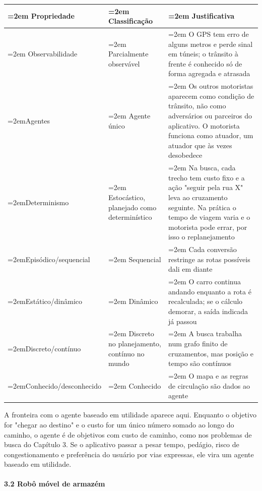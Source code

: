 \documentclass[12pt, a4paper]{article}
\begin{document}
\begingroup
\setlength{\tabcolsep}{4.0pt}
\begin{longtable}{@{}>{\raggedright\hyphenpenalty=30\tolerance=999\emergencystretch=2em\arraybackslash}p{4.50cm}>{\raggedright\hyphenpenalty=30\tolerance=999\emergencystretch=2em\arraybackslash}p{3.40cm}>{\raggedright\hyphenpenalty=30\tolerance=999\emergencystretch=2em\arraybackslash}p{6.82cm}@{}}
\toprule\noalign{}
Propriedade & Clas\-si\-fi\-ca\-ção & Justificativa \\
\midrule\noalign{}
\endhead
\bottomrule\noalign{}
\endlastfoot
Observabilidade & Parcialmente ob\-ser\-vá\-vel & O GPS tem erro de alguns metros e perde sinal em túneis; o trânsito à frente é conhecido só de forma agregada e atrasada \\
Agentes & Agente único & Os outros motoristas aparecem como condição de trânsito, não como ad\-ver\-sá\-rios ou parceiros do aplicativo. O motorista funciona como atuador, um atuador que às vezes desobedece \\
Determinismo & Es\-to\-cás\-tico, planejado como de\-ter\-mi\-nís\-tico & Na busca, cada trecho tem custo fixo e a ação "seguir pela rua X" leva ao cruzamento seguinte. Na prática o tempo de viagem varia e o motorista pode errar, por isso o replanejamento \\
Episódico\slash sequencial & Sequencial & Cada conversão restringe as rotas possíveis dali em diante \\
Estático\slash dinâmico & Dinâmico & O carro continua andando enquanto a rota é recalculada; se o cálculo demorar, a saída indicada já passou \\
Discreto\slash contínuo & Discreto no planejamento, contínuo no mundo & A busca trabalha num grafo finito de cruzamentos, mas posição e tempo são contínuos \\
Conhecido\slash desconhecido & Conhecido & O mapa e as regras de cir\-cu\-la\-ção são dados ao agente \\
\end{longtable}
\endgroup

A fronteira com o agente baseado em utilidade aparece aqui. Enquanto o objetivo for "chegar ao destino" e o custo for um único número somado ao longo do caminho, o agente é de objetivos com custo de caminho, como nos problemas de busca do Capítulo 3. Se o aplicativo passar a pesar tempo, pedágio, risco de congestionamento e preferência do usuário por vias expressas, ele vira um agente baseado em utilidade.

\paragraph{3.2 Robô móvel de armazém}\label{32-robuxf4-muxf3vel-de-armazuxe9m}
\end{document}
